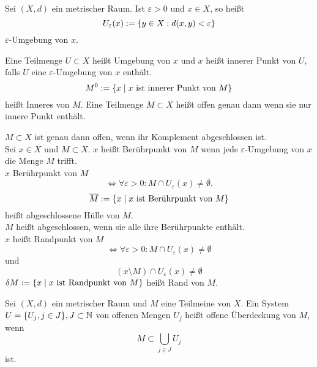 \documentclass[../ana2u.tex]{subfiles}
\begin{document}
    \begin{defi}
        Sei \((X,d)\) ein metrischer Raum. 
        Ist \( \varepsilon > 0 \) und \( x\in X \), so 
        heißt 
        \[ U_\varepsilon(x) 
        := \{ y \in X: d(x,y) < \varepsilon \} \]
        \( \varepsilon \)-Umgebung von \(x\).
    \end{defi}
    \begin{defi}
        Eine Teilmenge \( U \subset X \) heißt Umgebung 
        von \(x\) und \(x\) heißt innerer Punkt von \(U\), 
        falls \(U\) eine \(\varepsilon \)-Umgebung von \(x\) 
        enthält.
        \[ M^0 := \{x \; \vert \; 
        x \text{ ist innerer Punkt von } M \} \]
        heißt Inneres von \(M\).
        Eine Teilmenge \( M \subset X \) heißt offen genau 
        dann wenn sie nur innere Punkt enthält.
    \end{defi}
    \begin{defi}
        \( M \subset X \) ist genau dann offen, wenn 
        ihr Komplement abgeschlossen ist.\\
        Sei \( x \in X \) und \( M \subset X \). 
        \(x\) heißt Berührpunkt von \(M\) wenn jede 
        \( \varepsilon \)-Umgebung von \(x\) die Menge 
        \(M\) trifft.\\
        \( x \) Berührpunkt von \(M\) 
        \[ \Leftrightarrow \forall \varepsilon > 0: 
        M \cap U_\varepsilon(x) \neq \emptyset. \]
        \[ \overline{M} := \{ x \;\vert \; 
        x \text{ ist Berührpunkt von }M \} \] 
        heißt abgeschlossene Hülle von \(M\).\\
        \( M \) heißt abgeschlossen, wenn sie alle 
        ihre Berührpunkte enthält.\\
        \(x\) heißt Randpunkt von \( M \) 
        \[ \Leftrightarrow \forall \varepsilon > 0 : 
        M \cap U_\varepsilon(x) \neq \emptyset \] 
        und \[ (x \setminus M) \cap U_\varepsilon(x) \neq \emptyset \]
        \( \delta M := \{ x \;\vert\; x 
        \text{ ist Randpunkt von } M \} \) heißt 
        Rand von \(M\).
    \end{defi}
    \begin{defi}
        Sei \((X, d)\) ein metrischer Raum und \(M\) eine Teilmeine von
        \(X\). Ein System \(U = \{U_j, j \in J\}, J \subset \mathbb{N}\)
        von offenen Mengen \(U_j\) heißt offene Überdeckung von \(M\),
        wenn
        \[ M \subset \bigcup_{j \in J} U_j \]
        ist.        
    \end{defi}
\end{document}
